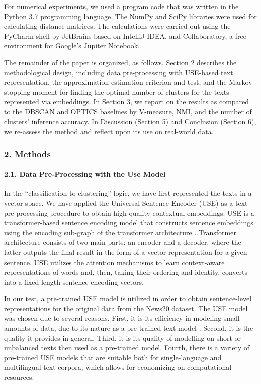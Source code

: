 For numerical experiments, we used a program code that was written in the Python 3.7 programming language. The NumPy and SciPy libraries were used for calculating distance matrices. The calculations were carried out using the PyCharm shell by JetBrains based on IntelliJ IDEA, and Collaboratory, a free environment for Google’s Jupiter Notebook.

The remainder of the paper is organized, as follows. Section 2 describes the methodological design, including data pre-processing with USE-based text representation, the approximation-estimation criterion and test, and the Markov stopping moment for finding the optimal number of clusters for the texts represented via embeddings. In Section 3, we report on the results as compared to the DBSCAN and OPTICS baselines by V-measure, NMI, and the number of clusters’ inference accuracy. In Discussion (Section 5) and Conclusion (Section 6), we re-assess the method and reflect upon its use on real-world data.

\subsubsection{2. Methods}

\paragraph{2.1. Data Pre-Processing with the Use Model}
In the “classification-to-clustering” logic, we have first represented the texts in a vector space. We have applied the Universal Sentence Encoder (USE) as a text pre-processing procedure to obtain high-quality contextual embeddings. USE is a transformer-based sentence encoding model that constructs sentence embeddings using the encoding sub-graph of the transformer architecture \cite{CerYangKong}. Transformer architecture consists of two main parts: an encoder and a decoder, where the latter outputs the final result in the form of a vector representation for a given sentence. USE utilizes the attention mechanisms to learn context-aware representations of words and, then, taking their ordering and identity, converts into a fixed-length sentence encoding vectors.

In our test, a pre-trained USE model is utilized in order to obtain sentence-level representations for the original data from the News20 dataset. The USE model was chosen due to several reasons. First, it is its efficiency in modeling small amounts of data, due to its nature as a pre-trained text model \cite{AharoniGoldberg}. Second, it is the quality it provides in general. Third, it is its quality of modelling on short or unbalanced texts then used as a pre-trained model. Fourth, there is a variety of pre-trained USE models that are suitable both for single-language and multilingual text corpora, which allows for economizing on computational resources.

